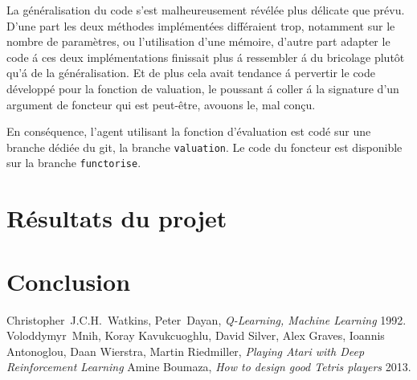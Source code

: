 \documentclass{report}
\begin{document}
La généralisation du code s'est malheureusement révélée plus
délicate que prévu. D'une part les deux méthodes implémentées
différaient trop, notamment sur le nombre de paramètres, ou
l'utilisation d'une mémoire, d'autre part adapter le code \'a ces deux
implémentations finissait plus \'a ressembler \'a du bricolage plutôt qu'\'a
de la généralisation. Et de plus cela avait tendance \'a pervertir le code
développé pour la fonction de valuation, le poussant \'a coller \'a la
signature d'un argument de foncteur qui est peut-être, avouons le, mal conçu.

En conséquence, l'agent utilisant la fonction d'évaluation est codé sur
une branche dédiée du git, la branche \texttt{valuation}. Le code du
foncteur est disponible sur la branche \texttt{functorise}.
\chapter{Résultats du projet}

\chapter*{Conclusion}

\begin{thebibliography}{9}
    Christopher~J.C.H.~Watkins, Peter~Dayan,
    \textit{Q-Learning, Machine Learning}
    1992.
    Voloddymyr~Mnih, Koray Kavukcuoghlu, David Silver, Alex Graves, Ioannis
    Antonoglou, Daan Wierstra, Martin Riedmiller,
    \textit{Playing Atari with Deep Reinforcement Learning}
    Amine Boumaza,
    \textit{How to design good Tetris players}
    2013.
\end{thebibliography}
\end{document}
